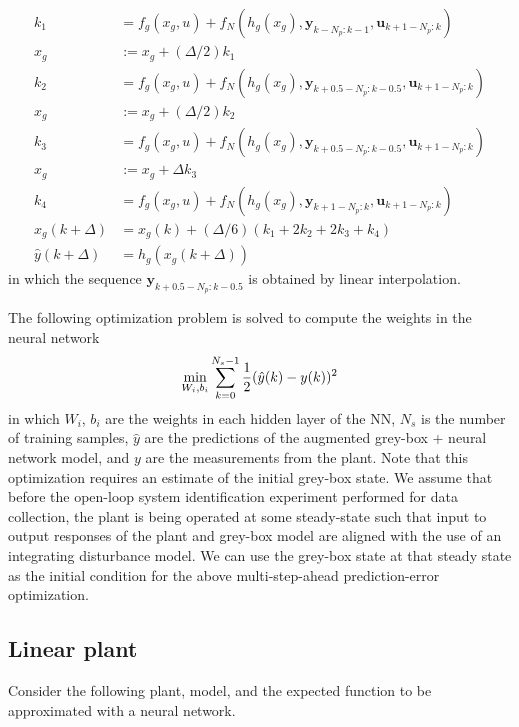 \documentclass{article}
\begin{document}
\begin{align*}
  k_1 &= f_g(x_g, u) + 
  f_N(h_g(x_g), \mathbf{y}_{k-N_p:k-1}, \mathbf{u}_{k+1-N_p:k}) \\
  x_g & := x_g + (\Delta/2)k_1 \\
  k_2 &= f_g(x_g, u) + 
  f_N(h_g(x_g), \mathbf{y}_{k+0.5-N_p:k-0.5}, \mathbf{u}_{k+1-N_p:k})\\
  x_g & := x_g + (\Delta/2)k_2 \\
  k_3 &= f_g(x_g, u) + 
  f_N(h_g(x_g), \mathbf{y}_{k+0.5-N_p:k-0.5}, \mathbf{u}_{k+1-N_p:k})\\
  x_g & := x_g + \Delta k_3 \\
  k_4 &= f_g(x_g, u) + 
  f_N(h_g(x_g), \mathbf{y}_{k+1-N_p:k}, \mathbf{u}_{k+1-N_p:k})\\
  x_g(k+\Delta) &= x_g(k) + (\Delta/6)(k_1 + 2k_2 + 2k_3 + k_4) \\
  \hat{y}(k+\Delta) &= h_g(x_g(k+\Delta)) 
\end{align*}
in which the sequence $\mathbf{y}_{k+0.5-N_p:k-0.5}$ is obtained by 
linear interpolation.

The following optimization problem is solved to compute 
the weights in the neural network
\begin{align*}
\underset{W_i, b_i}{\textnormal{min}} \sum_{k=0}^{N_s-1} 
\dfrac{1}{2}(\hat{y}(k) - y(k))^2
 \end{align*}
in which $W_i$, $b_i$ are the weights in each hidden layer of the NN, 
$N_s$ is the number of training samples, 
$\hat{y}$ are the predictions of the augmented
grey-box + neural network model, and $y$
are the measurements from the plant.
Note that this optimization requires an estimate 
of the initial grey-box state. We assume that 
before the open-loop system identification experiment 
performed for data collection, 
the plant is being operated at some 
steady-state such that input to output
responses of the plant and grey-box model are aligned with 
the use of an integrating disturbance model. We can use 
the grey-box state at that steady state as the initial condition 
for the above multi-step-ahead prediction-error
optimization.

\subsection{Linear plant}

Consider the following plant, model,
and the expected function to be approximated 
with a neural network.
\end{document}
